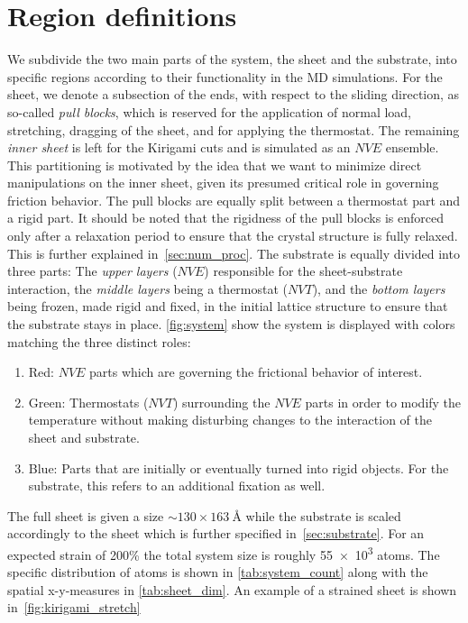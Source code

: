 \section{Region definitions}
We subdivide the two main parts of the system, the sheet and the substrate, into
specific regions according to their functionality in the \acrshort{MD}
simulations. For the sheet, we denote a subsection of the ends, with respect to
the sliding direction, as so-called \textit{pull blocks}, which is reserved for
the application of normal load, stretching, dragging of the sheet, and for
applying the thermostat. The remaining \textit{inner sheet} is left for the
Kirigami cuts and is simulated as an $NVE$ ensemble. This partitioning is motivated by the idea that we want to minimize direct manipulations on the inner sheet, given its presumed critical role in governing friction behavior. The pull blocks are
equally split between a thermostat part and a rigid part. It should be noted that the rigidness of the pull blocks is enforced only after a relaxation period to ensure that the crystal structure is fully relaxed. This is further explained in~\cref{sec:num_proc}. The substrate is equally divided into three parts: The
\textit{upper layers} ($NVE$) responsible for the sheet-substrate interaction,
the \textit{middle layers} being a thermostat ($NVT$), and the \textit{bottom
layers} being frozen, made rigid and fixed, in the initial lattice structure to
ensure that the substrate stays in place. \cref{fig:system} show the system is
displayed with colors matching the three distinct roles:
\begin{enumerate}
  \item Red: $NVE$ parts which are governing the frictional behavior of interest.
  \item Green: Thermostats ($NVT$) surrounding the $NVE$ parts in order to modify the temperature without making disturbing changes to the interaction of the sheet and substrate.
  \item Blue: Parts that are initially or eventually turned into rigid objects. For the substrate, this refers to an additional fixation as well.
\end{enumerate}
The full sheet is given a size $\sim 130 \times \SI{163}{\text{Å}}$ while the substrate is scaled accordingly to the sheet which is further specified in~\cref{sec:substrate}. For an expected strain of 200\% the total system size is roughly \num{55e3} atoms. The specific distribution of atoms is shown in \cref{tab:system_count} along with the spatial x-y-measures in \cref{tab:sheet_dim}. An example of a strained sheet is shown in~\cref{fig:kirigami_stretch}


